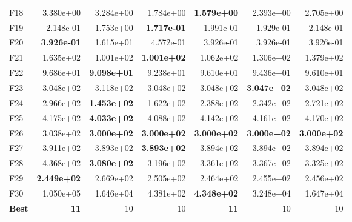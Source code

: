 \begin{tabular}{lrrrrrr}
F18 & 3.380e+00 & 3.284e+00 & 1.784e+00 & \textbf{1.579e+00} & 2.393e+00 & 2.705e+00 \\
F19 & 2.148e-01 & 1.753e+00 & \textbf{1.717e-01} & 1.991e-01 & 1.929e-01 & 2.148e-01 \\
F20 & \textbf{3.926e-01} & 1.615e+01 & 4.572e-01 & 3.926e-01 & 3.926e-01 & 3.926e-01 \\
F21 & 1.635e+02 & 1.001e+02 & \textbf{1.001e+02} & 1.062e+02 & 1.306e+02 & 1.379e+02 \\
F22 & 9.686e+01 & \textbf{9.098e+01} & 9.238e+01 & 9.610e+01 & 9.436e+01 & 9.610e+01 \\
F23 & 3.048e+02 & 3.118e+02 & 3.048e+02 & 3.048e+02 & \textbf{3.047e+02} & 3.048e+02 \\
F24 & 2.966e+02 & \textbf{1.453e+02} & 1.622e+02 & 2.388e+02 & 2.342e+02 & 2.721e+02 \\
F25 & 4.175e+02 & \textbf{4.033e+02} & 4.088e+02 & 4.142e+02 & 4.161e+02 & 4.170e+02 \\
F26 & 3.038e+02 & \textbf{3.000e+02} & \textbf{3.000e+02} & \textbf{3.000e+02} & \textbf{3.000e+02} & \textbf{3.000e+02} \\
F27 & 3.911e+02 & 3.893e+02 & \textbf{3.893e+02} & 3.894e+02 & 3.894e+02 & 3.894e+02 \\
F28 & 4.368e+02 & \textbf{3.080e+02} & 3.196e+02 & 3.361e+02 & 3.367e+02 & 3.325e+02 \\
F29 & \textbf{2.449e+02} & 2.669e+02 & 2.505e+02 & 2.464e+02 & 2.455e+02 & 2.456e+02 \\
F30 & 1.050e+05 & 1.646e+04 & 4.381e+02 & \textbf{4.348e+02} & 3.248e+04 & 1.647e+04 \\
\midrule
\textbf{Best} & \textbf{11} & 10 & 10 & \textbf{11} & 10 & 10 \\
\bottomrule
\end{tabular}